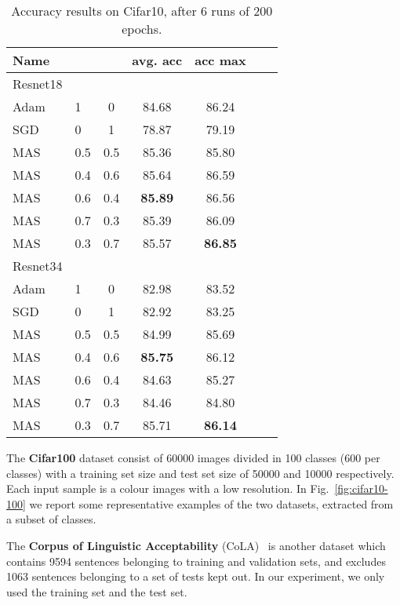 \documentclass[10pt,twocolumn,letterpaper]{article}
\begin{document}
\begin{table}
    \caption{Accuracy results on Cifar10, after 6 runs of 200 epochs.}
    \label{tab:accuracyCifar10}
    \begin{center}
        \begin{tabular}{llccccc} 
            \hline
            Name &  &  & avg. acc & acc max\\
            \hline
            Resnet18 &  & & \\
            \hline
            Adam & 1 & 0 & 84.68 & 86.24 \\
            SGD & 0 & 1 & 78.87 & 79.19 \\
            MAS & 0.5 & 0.5 & 85.36 & 85.80 \\
            MAS & 0.4 & 0.6 & 85.64 & 86.59 \\
            MAS & 0.6 & 0.4 & \textbf{85.89} & 86.56 \\
            MAS & 0.7 & 0.3 & 85.39 & 86.09 \\
            MAS & 0.3 & 0.7 & 85.57 & \textbf{86.85} \\
            \hline
            Resnet34 & & & \\
            \hline
            Adam & 1 & 0 & 82.98 & 83.52 \\
            SGD & 0 & 1 & 82.92 & 83.25 \\
            MAS & 0.5 & 0.5 & 84.99 & 85.69 \\
            MAS & 0.4 & 0.6 & \textbf{85.75} & 86.12\\
            MAS & 0.6 & 0.4 & 84.63 &  85.27 \\
            MAS & 0.7 & 0.3 & 84.46 & 84.80 \\
            MAS & 0.3 & 0.7 & 85.71 & \textbf{86.14} \\
            \hline
        \end{tabular}
    \end{center}
\end{table}

The \textbf{Cifar100} \cite{cifar} dataset consist of 60000 images divided in 100 classes (600 per classes) with a training set size and test set size of 50000 and 10000 respectively.
Each input sample is a  colour images with a low resolution.
In Fig.~\ref{fig:cifar10-100} we report some representative examples of the two datasets, extracted from a subset of classes.

The \textbf{Corpus of Linguistic Acceptability} (CoLA)~\cite{warstadt2018neural} is another dataset which contains 9594 sentences belonging to training and validation sets, and excludes 1063 sentences belonging to a set of tests kept out. In our experiment, we only used the training set and the test set.
\end{document}
